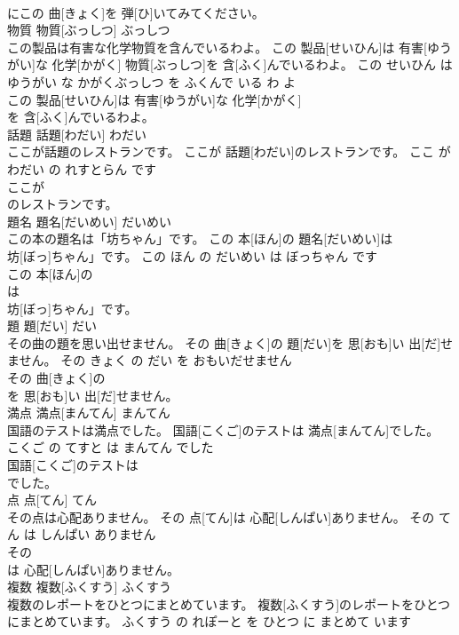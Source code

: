 \documentclass[8pt]{extreport}
\begin{document}
\begin{CJK}{UTF8}{min}
\\	にこの 曲[きょく]を 弾[ひ]いてみてください。			
\\	物質	物質[ぶっしつ]	ぶっしつ	
\\	この製品は有害な化学物質を含んでいるわよ。	この 製品[せいひん]は 有害[ゆうがい]な 化学[かがく] 物質[ぶっしつ]を 含[ふく]んでいるわよ。	この せいひん は ゆうがい な かがくぶっしつ を ふくんで いる わ よ	
\\	この 製品[せいひん]は 有害[ゆうがい]な 化学[かがく]
\\	を 含[ふく]んでいるわよ。			
\\	話題	話題[わだい]	わだい	
\\	ここが話題のレストランです。	ここが 話題[わだい]のレストランです。	ここ が わだい の れすとらん です	
\\	ここが
\\	のレストランです。			
\\	題名	題名[だいめい]	だいめい	
\\	この本の題名は「坊ちゃん」です。	この 本[ほん]の 題名[だいめい]は
\\	坊[ぼっ]ちゃん」です。	この ほん の だいめい は ぼっちゃん です	
\\	この 本[ほん]の
\\	は
\\	坊[ぼっ]ちゃん」です。			
\\	題	題[だい]	だい	
\\	その曲の題を思い出せません。	その 曲[きょく]の 題[だい]を 思[おも]い 出[だ]せません。	その きょく の だい を おもいだせません	
\\	その 曲[きょく]の
\\	を 思[おも]い 出[だ]せません。			
\\	満点	満点[まんてん]	まんてん	
\\	国語のテストは満点でした。	国語[こくご]のテストは 満点[まんてん]でした。	こくご の てすと は まんてん でした	
\\	国語[こくご]のテストは
\\	でした。			
\\	点	点[てん]	てん	
\\	その点は心配ありません。	その 点[てん]は 心配[しんぱい]ありません。	その てん は しんぱい ありません	
\\	その
\\	は 心配[しんぱい]ありません。			
\\	複数	複数[ふくすう]	ふくすう	
\\	複数のレポートをひとつにまとめています。	複数[ふくすう]のレポートをひとつにまとめています。	ふくすう の れぽーと を ひとつ に まとめて います	

\end{CJK}
\end{document}
